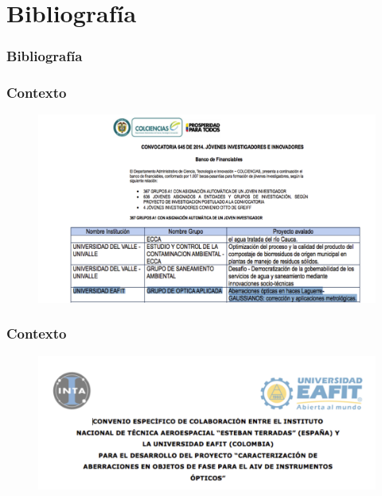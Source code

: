 \documentclass[xcolor=table,serif]{beamer}
\newif\ifplacelogo %
\begin{document}
\section{Bibliografía}
\tiny
  \begin{frame}[allowframebreaks]
  \frametitle{Bibliograf\'ia}
\nocite{*}
  
  
  \end{frame}
\placelogotrue 
 \begin{frame}
   \frametitle{Contexto}
   \begin{figure}
     \centering
     \includegraphics[scale = .5]{Figures/presentation/jovenes_inv_conv.png}
   \end{figure}
 \end{frame}
 \begin{frame}
   \frametitle{Contexto}
   \begin{figure}
     \centering
     \includegraphics[scale = .5]{Figures/presentation/inta_conv.png}
   \end{figure}
 \end{frame}
\end{document}
